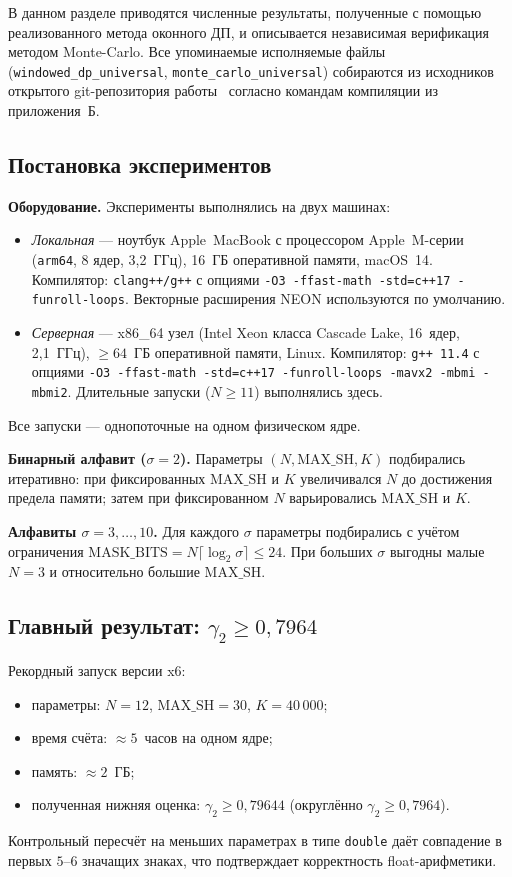 В данном разделе приводятся численные результаты, полученные с помощью реализованного метода оконного ДП, и описывается независимая верификация методом Monte-Carlo. Все упоминаемые исполняемые файлы (\texttt{windowed\_dp\_universal}, \texttt{monte\_carlo\_universal}) собираются из исходников открытого git-репозитория работы~\cite{ourgithub} согласно командам компиляции из приложения~Б.

\subsection{Постановка экспериментов}

\textbf{Оборудование.} Эксперименты выполнялись на двух машинах:
\begin{itemize}
    \item \emph{Локальная} --- ноутбук Apple~MacBook с процессором Apple~M-серии (\texttt{arm64}, 8 ядер, 3{,}2~ГГц), 16~ГБ оперативной памяти, macOS~14. Компилятор: \texttt{clang++/g++} с опциями \texttt{-O3 -ffast-math -std=c++17 -funroll-loops}. Векторные расширения NEON используются по умолчанию.
    \item \emph{Серверная} --- x86\_64 узел (Intel Xeon класса Cascade Lake, 16~ядер, 2{,}1~ГГц), $\geq 64$~ГБ оперативной памяти, Linux. Компилятор: \texttt{g++~11.4} с опциями \texttt{-O3 -ffast-math -std=c++17 -funroll-loops -mavx2 -mbmi -mbmi2}. Длительные запуски ($N \geq 11$) выполнялись здесь.
\end{itemize}
Все запуски --- однопоточные на одном физическом ядре.

\textbf{Бинарный алфавит ($\sigma = 2$).} Параметры $(N, \mathrm{MAX\_SH}, K)$ подбирались итеративно: при фиксированных $\mathrm{MAX\_SH}$ и $K$ увеличивался $N$ до достижения предела памяти; затем при фиксированном $N$ варьировались $\mathrm{MAX\_SH}$ и $K$.

\textbf{Алфавиты $\sigma = 3, \ldots, 10$.} Для каждого $\sigma$ параметры подбирались с учётом ограничения $\mathrm{MASK\_BITS} = N \lceil \log_2 \sigma \rceil \leq 24$. При больших $\sigma$ выгодны малые $N = 3$ и относительно большие $\mathrm{MAX\_SH}$.

\subsection{Главный результат: $\gamma_2 \geq 0{,}7964$}

Рекордный запуск версии x6:
\begin{itemize}
    \item параметры: $N = 12$, $\mathrm{MAX\_SH} = 30$, $K = 40\,000$;
    \item время счёта: $\approx 5$~часов на одном ядре;
    \item память: $\approx 2$~ГБ;
    \item полученная нижняя оценка: $\gamma_2 \geq 0{,}79644$ (округлённо $\gamma_2 \geq 0{,}7964$).
\end{itemize}
Контрольный пересчёт на меньших параметрах в типе \texttt{double} даёт совпадение в первых $5$--$6$ значащих знаках, что подтверждает корректность float-арифметики.

